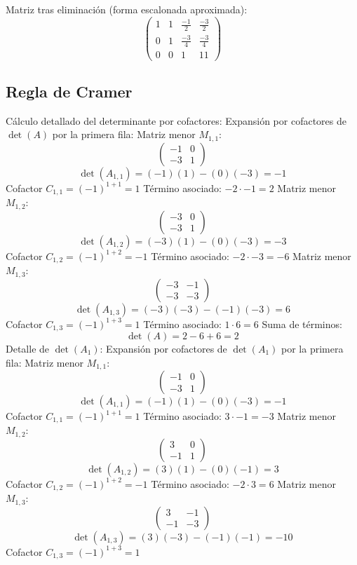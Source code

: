 \documentclass{article}
\begin{document}
Matriz tras eliminación (forma escalonada aproximada):
\[\begin{pmatrix}1 & 1 & \frac{-1}{2} & \frac{-3}{2} \\ 0 & 1 & \frac{-3}{4} & \frac{-3}{4} \\ 0 & 0 & 1 & 11\end{pmatrix}\]
\subsection*{Regla de Cramer}
Cálculo detallado del determinante por cofactores:
Expansión por cofactores de $\det(A)$ por la primera fila:
Matriz menor $M_{1,1}$:
\[\begin{pmatrix}-1 & 0 \\ -3 & 1\end{pmatrix}\]
\[\det(A_{1,1}) = (-1)(1) - (0)(-3) = -1\]
Cofactor $C_{1,1} = (-1)^{1+1} = 1$
Término asociado: $ -2 \cdot -1 = 2 $
Matriz menor $M_{1,2}$:
\[\begin{pmatrix}-3 & 0 \\ -3 & 1\end{pmatrix}\]
\[\det(A_{1,2}) = (-3)(1) - (0)(-3) = -3\]
Cofactor $C_{1,2} = (-1)^{1+2} = -1$
Término asociado: $ -2 \cdot -3 = -6 $
Matriz menor $M_{1,3}$:
\[\begin{pmatrix}-3 & -1 \\ -3 & -3\end{pmatrix}\]
\[\det(A_{1,3}) = (-3)(-3) - (-1)(-3) = 6\]
Cofactor $C_{1,3} = (-1)^{1+3} = 1$
Término asociado: $ 1 \cdot 6 = 6 $
Suma de términos:
\[\det(A) = 2 - 6 + 6 = 2\]
Detalle de $\det(A_{1})$:
Expansión por cofactores de $\det(A_{1})$ por la primera fila:
Matriz menor $M_{1,1}$:
\[\begin{pmatrix}-1 & 0 \\ -3 & 1\end{pmatrix}\]
\[\det(A_{1,1}) = (-1)(1) - (0)(-3) = -1\]
Cofactor $C_{1,1} = (-1)^{1+1} = 1$
Término asociado: $ 3 \cdot -1 = -3 $
Matriz menor $M_{1,2}$:
\[\begin{pmatrix}3 & 0 \\ -1 & 1\end{pmatrix}\]
\[\det(A_{1,2}) = (3)(1) - (0)(-1) = 3\]
Cofactor $C_{1,2} = (-1)^{1+2} = -1$
Término asociado: $ -2 \cdot 3 = 6 $
Matriz menor $M_{1,3}$:
\[\begin{pmatrix}3 & -1 \\ -1 & -3\end{pmatrix}\]
\[\det(A_{1,3}) = (3)(-3) - (-1)(-1) = -10\]
Cofactor $C_{1,3} = (-1)^{1+3} = 1$
\end{document}
